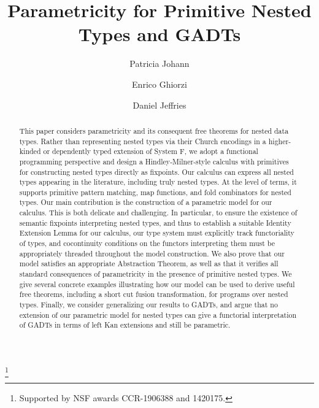 \documentclass{lmcs}
\theoremstyle{plain}\newtheorem{satz}[thm]{Satz}
\begin{document}
\title[Parametricity for Primitive Nested Types and
  GADTs]{Parametricity for Primitive Nested Types and GADTs}

\author[P.~Johann]{Patricia Johann}	
\address{Appalachian State University}	
\thanks{Supported by NSF awards CCR-1906388 and 1420175.}

\author[E.~Ghiorzi]{Enrico Ghiorzi}	
\address{Appalachian State University}	

\author[D.~Jeffries]{Daniel Jeffries}	
\address{Appalachian State University}	

\begin{abstract}
This paper considers parametricity and its consequent free theorems
for nested data types. Rather than representing nested types via their
Church encodings in a higher-kinded or dependently typed extension of
System F, we adopt a functional programming perspective and design a
Hindley-Milner-style calculus with primitives for constructing nested
types directly as fixpoints. Our calculus can express all nested types
appearing in the literature, including truly nested types. At the
level of terms, it supports primitive pattern matching, map functions,
and fold combinators for nested types. Our main contribution is the
construction of a parametric model for our calculus. This is both
delicate and challenging. In particular, to ensure the existence of
semantic fixpoints interpreting nested types, and thus to establish a
suitable Identity Extension Lemma for our calculus, our type system
must explicitly track functoriality of types, and cocontinuity
conditions on the functors interpreting them must be appropriately
threaded throughout the model construction. We also prove that our
model satisfies an appropriate Abstraction Theorem, as well as that it
verifies all standard consequences of parametricity in the presence of
primitive nested types. We give several concrete examples illustrating
how our model can be used to derive useful free theorems, including a
short cut fusion transformation, for programs over nested
types. Finally, we consider generalizing our results to GADTs, and
argue that no extension of our parametric model for nested types can
give a functorial interpretation of GADTs in terms of left Kan
extensions and still be parametric.
\end{abstract}

\maketitle
\end{document}
